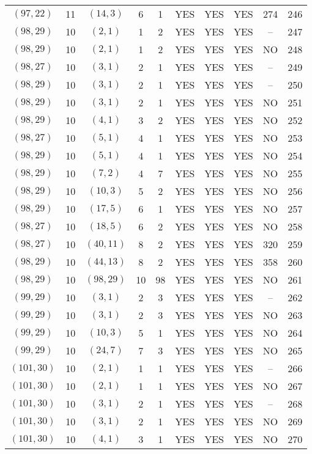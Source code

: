 \begin{longtable}{|c|c|c|c|c|c|c|c|c|c|}
$(97, 22)$ & 11 & $(14, 3)$ & 6 & 1 & YES & YES & YES & 274 & 246\\
$(98, 29)$ & 10 & $(2, 1)$ & 1 & 2 & YES & YES & YES & -- & 247\\
$(98, 29)$ & 10 & $(2, 1)$ & 1 & 2 & YES & YES & YES & NO & 248\\
$(98, 27)$ & 10 & $(3, 1)$ & 2 & 1 & YES & YES & YES & -- & 249\\
$(98, 29)$ & 10 & $(3, 1)$ & 2 & 1 & YES & YES & YES & -- & 250\\
$(98, 29)$ & 10 & $(3, 1)$ & 2 & 1 & YES & YES & YES & NO & 251\\
$(98, 29)$ & 10 & $(4, 1)$ & 3 & 2 & YES & YES & YES & NO & 252\\
$(98, 27)$ & 10 & $(5, 1)$ & 4 & 1 & YES & YES & YES & NO & 253\\
$(98, 29)$ & 10 & $(5, 1)$ & 4 & 1 & YES & YES & YES & NO & 254\\
$(98, 29)$ & 10 & $(7, 2)$ & 4 & 7 & YES & YES & YES & NO & 255\\
$(98, 29)$ & 10 & $(10, 3)$ & 5 & 2 & YES & YES & YES & NO & 256\\
$(98, 29)$ & 10 & $(17, 5)$ & 6 & 1 & YES & YES & YES & NO & 257\\
$(98, 27)$ & 10 & $(18, 5)$ & 6 & 2 & YES & YES & YES & NO & 258\\
$(98, 27)$ & 10 & $(40, 11)$ & 8 & 2 & YES & YES & YES & 320 & 259\\
$(98, 29)$ & 10 & $(44, 13)$ & 8 & 2 & YES & YES & YES & 358 & 260\\
$(98, 29)$ & 10 & $(98, 29)$ & 10 & 98 & YES & YES & YES & NO & 261\\
$(99, 29)$ & 10 & $(3, 1)$ & 2 & 3 & YES & YES & YES & -- & 262\\
$(99, 29)$ & 10 & $(3, 1)$ & 2 & 3 & YES & YES & YES & NO & 263\\
$(99, 29)$ & 10 & $(10, 3)$ & 5 & 1 & YES & YES & YES & NO & 264\\
$(99, 29)$ & 10 & $(24, 7)$ & 7 & 3 & YES & YES & YES & NO & 265\\
$(101, 30)$ & 10 & $(2, 1)$ & 1 & 1 & YES & YES & YES & -- & 266\\
$(101, 30)$ & 10 & $(2, 1)$ & 1 & 1 & YES & YES & YES & NO & 267\\
$(101, 30)$ & 10 & $(3, 1)$ & 2 & 1 & YES & YES & YES & -- & 268\\
$(101, 30)$ & 10 & $(3, 1)$ & 2 & 1 & YES & YES & YES & NO & 269\\
$(101, 30)$ & 10 & $(4, 1)$ & 3 & 1 & YES & YES & YES & NO & 270\\

\end{longtable}
